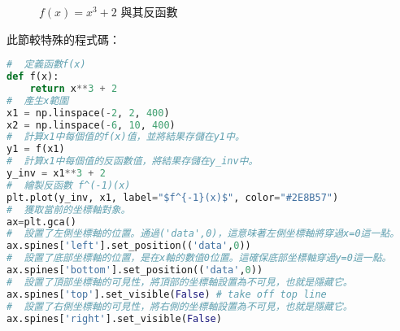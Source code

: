 \begin{figure}[H]
    \caption{$f(x)=x^3+2 $ 與其反函數}
    \label{fig:inf}
\end{figure}
此節較特殊的程式碼：
\begin{lstlisting}[language=Python]
#  定義函數f(x)
def f(x):
    return x**3 + 2
#  產生x範圍
x1 = np.linspace(-2, 2, 400)
x2 = np.linspace(-6, 10, 400)
#  計算x1中每個值的f(x)值，並將結果存儲在y1中。
y1 = f(x1)
#  計算x1中每個值的反函數值，將結果存儲在y_inv中。
y_inv = x1**3 + 2
#  繪製反函數 f^(-1)(x)
plt.plot(y_inv, x1, label="$f^{-1}(x)$", color="#2E8B57")
#  獲取當前的坐標軸對象。
ax=plt.gca()
#  設置了左側坐標軸的位置。通過('data',0)，這意味著左側坐標軸將穿過x=0這一點。
ax.spines['left'].set_position(('data',0))
#  設置了底部坐標軸的位置，是在x軸的數值0位置。這確保底部坐標軸穿過y=0這一點。
ax.spines['bottom'].set_position(('data',0))
#  設置了頂部坐標軸的可見性，將頂部的坐標軸設置為不可見，也就是隱藏它。
ax.spines['top'].set_visible(False) # take off top line
#  設置了右側坐標軸的可見性，將右側的坐標軸設置為不可見，也就是隱藏它。
ax.spines['right'].set_visible(False)
\end{lstlisting}

